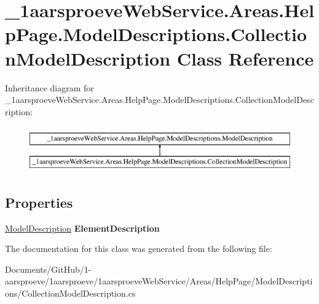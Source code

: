 \hypertarget{class__1aarsproeve_web_service_1_1_areas_1_1_help_page_1_1_model_descriptions_1_1_collection_model_description}{}\section{\+\_\+1aarsproeve\+Web\+Service.\+Areas.\+Help\+Page.\+Model\+Descriptions.\+Collection\+Model\+Description Class Reference}
\label{class__1aarsproeve_web_service_1_1_areas_1_1_help_page_1_1_model_descriptions_1_1_collection_model_description}
Inheritance diagram for \+\_\+1aarsproeve\+Web\+Service.\+Areas.\+Help\+Page.\+Model\+Descriptions.\+Collection\+Model\+Description\+:\begin{figure}[H]
\begin{center}
\leavevmode
\includegraphics[height=2.000000cm]{class__1aarsproeve_web_service_1_1_areas_1_1_help_page_1_1_model_descriptions_1_1_collection_model_description}
\end{center}
\end{figure}
\subsection*{Properties}
\begin{DoxyCompactItemize}
\item 
\hypertarget{class__1aarsproeve_web_service_1_1_areas_1_1_help_page_1_1_model_descriptions_1_1_collection_model_description_a9f59a1485146c386bb767ff88380e3b2}{}\hyperlink{class__1aarsproeve_web_service_1_1_areas_1_1_help_page_1_1_model_descriptions_1_1_model_description}{Model\+Description} {\bfseries Element\+Description}\label{class__1aarsproeve_web_service_1_1_areas_1_1_help_page_1_1_model_descriptions_1_1_collection_model_description_a9f59a1485146c386bb767ff88380e3b2}

\end{DoxyCompactItemize}


The documentation for this class was generated from the following file\+:\begin{DoxyCompactItemize}
\item 
Documents/\+Git\+Hub/1-\/aarsproeve/1aarsproeve/1aarsproeve\+Web\+Service/\+Areas/\+Help\+Page/\+Model\+Descriptions/Collection\+Model\+Description.\+cs\end{DoxyCompactItemize}
